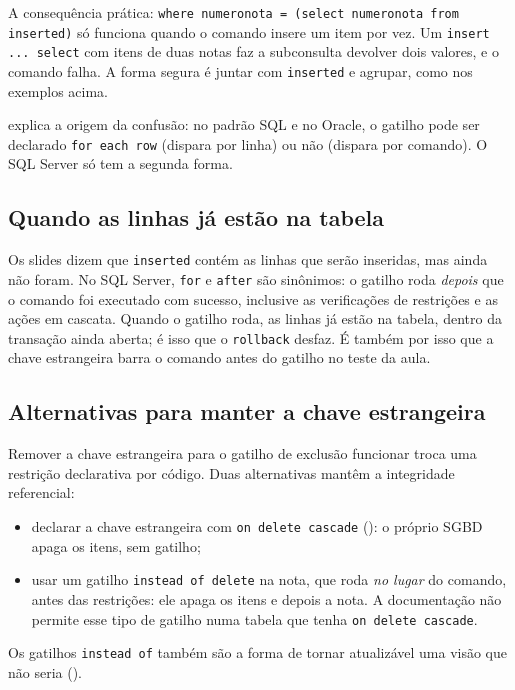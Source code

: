 A consequência prática: \texttt{where numeronota = (select numeronota
from inserted)} só funciona quando o comando insere um item por vez. Um
\texttt{insert ... select} com itens de duas notas faz a subconsulta
devolver dois valores, e o comando falha. A forma segura é juntar com
\texttt{inserted} e agrupar, como nos exemplos acima.

\textcite[seção 26.1]{Elmasri2011} explica a origem da confusão: no
padrão SQL e no Oracle, o gatilho pode ser declarado \texttt{for each
row} (dispara por linha) ou não (dispara por comando). O SQL Server só
tem a segunda forma.

\subsection*{Quando as linhas já estão na tabela}

Os slides dizem que \texttt{inserted} contém as linhas que serão
inseridas, mas ainda não foram. No SQL Server, \texttt{for} e
\texttt{after} são sinônimos: o gatilho roda \emph{depois} que o comando
foi executado com sucesso, inclusive as verificações de restrições e as
ações em cascata. Quando o gatilho roda, as
linhas já estão na tabela, dentro da transação ainda aberta; é isso que
o \texttt{rollback} desfaz. É também por isso que a chave estrangeira
barra o comando antes do gatilho no teste da aula.

\subsection*{Alternativas para manter a chave estrangeira}

Remover a chave estrangeira para o gatilho de exclusão funcionar troca
uma restrição declarativa por código. Duas alternativas mantêm a
integridade referencial:

\begin{itemize}
	\item declarar a chave estrangeira com \texttt{on delete cascade}
	(): o próprio SGBD apaga os itens, sem gatilho;
	\item usar um gatilho \texttt{instead of delete} na nota, que roda
	\emph{no lugar} do comando, antes das restrições: ele apaga os itens
	e depois a nota. A documentação não permite esse tipo de gatilho numa
	tabela que tenha \texttt{on delete cascade}.
\end{itemize}

Os gatilhos \texttt{instead of} também são a forma de tornar atualizável
uma visão que não seria ().

